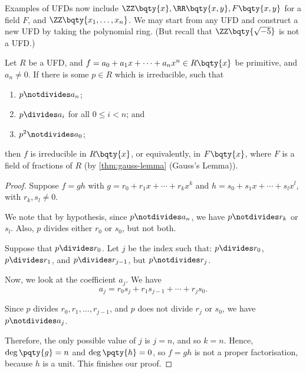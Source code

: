 \begin{examples}
    \label{ex:more-examples-ufd}%
    Examples of UFDs now include \(\ZZ\bqty{x}, \RR\bqty{x, y}, F\bqty{x, y}\) for a field \(F\), and \(\ZZ\bqty{x_1, \ldots, x_n}\). We may start from any UFD and construct a new UFD by taking the polynomial ring. (But recall that \(\ZZ\bqty{\sqrt{-5}}\) is not a UFD.)
\end{examples}

\begin{theorem}
    \label{thm:eisenstein}%
    Let \(R\) be a UFD, and \(f = a_0 + a_1 x + \cdots + a_n x^n \in R \bqty{x}\) be primitive, and \(a_n \neq 0\). If there is some \(p \in R\) which is irreducible, such that
    \begin{enumerate}
        \item \(p \notdivides a_n\);
        \item \(p \divides a_i\) for all \(0 \leq i < n\); and
        \item \(p^2 \notdivides a_0\);
   \end{enumerate}
   then \(f\) is irreducible in \(R\bqty{x}\), or equivalently, in \(F\bqty{x}\), where \(F\) is a field of fractions of \(R\) (by \autoref{thm:gauss-lemma} (Gauss's Lemma)).
\end{theorem}

\begin{proof}
    Suppose \(f = gh\) with \(g = r_0 + r_1 x + \cdots + r_k x^k\) and \(h = s_0 + s_1 x + \cdots + s_l x^l\), with \(r_k, s_l \neq 0\).

    We note that by hypothesis, since \(p \notdivides a_n\), we have \(p \notdivides r_k\) or \(s_l\). Also, \(p\) divides either \(r_0\) or \(s_0\), but not both.

    Suppose that \(p \divides r_0\). Let \(j\) be the index such that: \(p \divides r_0\), \(p \divides r_1\), and \(p \divides r_{j - 1}\), but \(p \notdivides r_j\).

    Now, we look at the coefficient \(a_j\). We have
    \[
        a_j = r_0 s_j + r_1 s_{j - 1} + \cdots + r_j s_0.
    \]

    Since \(p\) divides \(r_0, r_1, \ldots, r_{j - 1}\), and \(p\) does not divide \(r_j\) or \(s_0\), we have \(p \notdivides a_j\).

    Therefore, the only possible value of \(j\) is \(j = n\), and so \(k = n\). Hence, \(\deg\pqty{g} = n\) and \(\deg\pqty{h} = 0\), so \(f = gh\) is not a proper factorisation, because \(h\) is a unit. This finishes our proof.
\end{proof}

